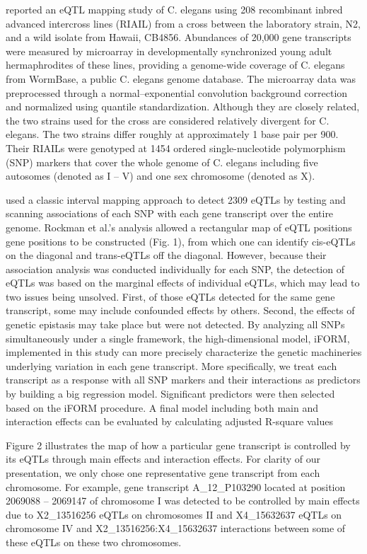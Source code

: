 \documentclass[11pt,]{book}
\theoremstyle{definition}
\theoremstyle{definition}
\theoremstyle{remark}
\begin{document}
\cite{rockman2010selection} reported an eQTL mapping study of C. elegans
using 208 recombinant inbred advanced intercross lines (RIAIL) from a
cross between the laboratory strain, N2, and a wild isolate from Hawaii,
CB4856. Abundances of 20,000 gene transcripts were measured by
microarray in developmentally synchronized young adult hermaphrodites of
these lines, providing a genome-wide coverage of C. elegans from
WormBase, a public C. elegans genome database. The microarray data was
preprocessed through a normal--exponential convolution background
correction and normalized using quantile standardization. Although they
are closely related, the two strains used for the cross are considered
relatively divergent for C. elegans. The two strains differ roughly at
approximately 1 base pair per 900. Their RIAILs were genotyped at 1454
ordered single-nucleotide polymorphism (SNP) markers that cover the
whole genome of C. elegans including five autosomes (denoted as I -- V)
and one sex chromosome (denoted as X).

\cite{rockman2010selection} used a classic interval mapping approach to
detect 2309 eQTLs by testing and scanning associations of each SNP with
each gene transcript over the entire genome. Rockman et al.'s analysis
allowed a rectangular map of eQTL positions  gene positions to be
constructed (Fig. 1), from which one can identify cis-eQTLs on the
diagonal and trans-eQTLs off the diagonal. However, because their
association analysis was conducted individually for each SNP, the
detection of eQTLs was based on the marginal effects of individual
eQTLs, which may lead to two issues being unsolved. First, of those
eQTLs detected for the same gene transcript, some may include confounded
effects by others. Second, the effects of genetic epistasis may take
place but were not detected. By analyzing all SNPs simultaneously under
a single framework, the high-dimensional model, iFORM, implemented in
this study can more precisely characterize the genetic machineries
underlying variation in each gene transcript. More specifically, we
treat each transcript as a response with all SNP markers and their
interactions as predictors by building a big regression model.
Significant predictors were then selected based on the iFORM procedure.
A final model including both main and interaction effects can be
evaluated by calculating adjusted R-square values

Figure 2 illustrates the map of how a particular gene transcript is
controlled by its eQTLs through main effects and interaction effects.
For clarity of our presentation, we only chose one representative gene
transcript from each chromosome. For example, gene transcript
A\_12\_P103290 located at position 2069088 -- 2069147 of chromosome I
was detected to be controlled by main effects due to X2\_13516256 eQTLs
on chromosomes II and X4\_15632637 eQTLs on chromosome IV and
X2\_13516256:X4\_15632637 interactions between some of these eQTLs on
these two chromosomes.
\end{document}
